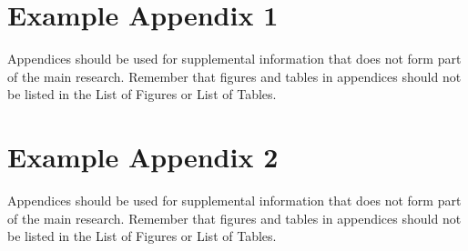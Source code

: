 \documentclass{imc-rai}
\begin{document}
\begin{appendices} %
\chapter{Example Appendix 1}

Appendices should be used for supplemental information that does not form part of the main research. Remember that figures and tables in appendices should not be listed in the List of Figures or List of Tables. 

\chapter{Example Appendix 2}

Appendices should be used for supplemental information that does not form part of the main research. Remember that figures and tables in appendices should not be listed in the List of Figures or List of Tables. 
	
\end{appendices}
\end{document}
